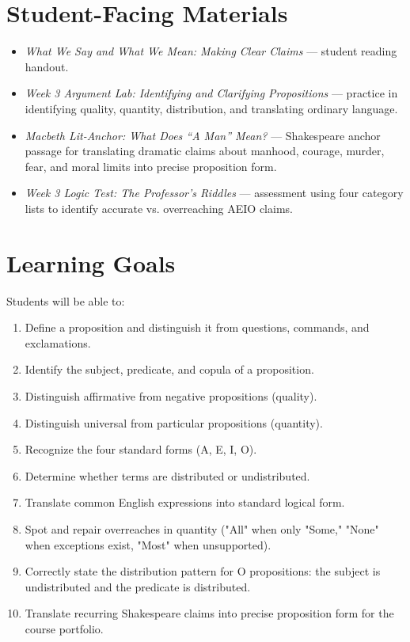 \documentclass[12pt]{article}
\begin{document}
\section*{Student-Facing Materials}
\begin{itemize}[leftmargin=*]
\item \textit{What We Say and What We Mean: Making Clear Claims} — student reading handout.
\item \textit{Week 3 Argument Lab: Identifying and Clarifying Propositions} — practice in identifying quality, quantity, distribution, and translating ordinary language.
\item \textit{Macbeth Lit-Anchor: What Does ``A Man'' Mean?} — Shakespeare anchor passage for translating dramatic claims about manhood, courage, murder, fear, and moral limits into precise proposition form.
\item \textit{Week 3 Logic Test: The Professor's Riddles} — assessment using four category lists to identify accurate vs. overreaching AEIO claims.
\end{itemize}

\section*{Learning Goals}
Students will be able to:
\begin{enumerate}[leftmargin=*]
\item Define a proposition and distinguish it from questions, commands, and exclamations.
\item Identify the subject, predicate, and copula of a proposition.
\item Distinguish affirmative from negative propositions (quality).
\item Distinguish universal from particular propositions (quantity).
\item Recognize the four standard forms (A, E, I, O).
\item Determine whether terms are distributed or undistributed.
\item Translate common English expressions into standard logical form.
\item Spot and repair overreaches in quantity ("All" when only "Some," "None" when exceptions exist, "Most" when unsupported).
\item Correctly state the distribution pattern for O propositions: the subject is undistributed and the predicate is distributed.
\item Translate recurring Shakespeare claims into precise proposition form for the course portfolio.
\end{enumerate}
\end{document}
